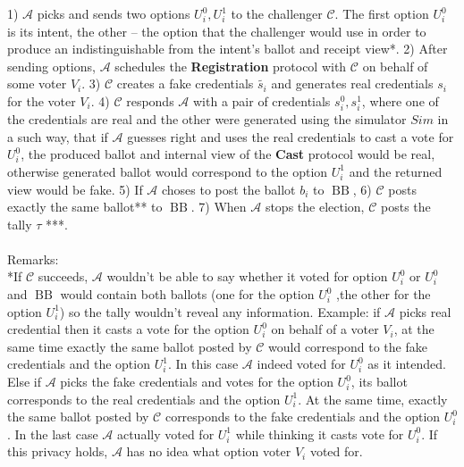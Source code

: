 \documentclass[12pt]{article}
\DeclareMathOperator{\bb}{BB}
\begin{document}
 1)  $\mathcal{A}$ picks and sends two options $U_i^0,U_i^1$ to the challenger $\mathcal{C}$. The first option $U_i^0$ is its intent, the other -- the option that the challenger would use in order to produce an indistinguishable from the intent's ballot and receipt view*. 2) After sending options, $\mathcal{A}$ schedules the   \textbf{Registration} protocol with $\mathcal{C}$ on behalf of some voter $V_i$. 3) $\mathcal{C}$ creates a fake credentials $\tilde{s_i}$ and generates real credentials $s_i$ for the voter $V_i$. 4) $\mathcal{C}$ responds $\mathcal{A}$ with a pair of credentials $s_i^0,s_i^1$, where one of the credentials are real and the other were generated using the simulator $Sim$ in a such way, that if $\mathcal{A}$ guesses right and uses the real credentials to cast a vote for $U_i^0$, the produced ballot and internal view of the \textbf{Cast} protocol would be real, otherwise generated ballot would correspond to the option $U_i^1$ and the returned view would be fake. 5) If $\mathcal{A}$ choses to post the ballot $b_i$ to $\bb$, 6) $\mathcal{C}$  posts exactly the same ballot** to $\bb$. 7) When $\mathcal{A}$ stops the election, $\mathcal{C}$ posts the tally $\tau$ ***. \\\\
Remarks:\\
*If  $\mathcal{C}$ succeeds, $\mathcal{A}$ wouldn't be able to say whether it voted for option $U_i^0$ or $U_i^0$ and $\bb$ would contain both ballots (one for the option $U_i^0$ ,the other for the option $U_i^1$) so the tally wouldn't reveal any information. Example: if $\mathcal{A}$  picks real credential then it casts a vote for the option  $U_i^0$ on behalf of a voter $V_i$, at the same time exactly the same ballot posted by $\mathcal{C}$ would correspond to the fake credentials and the option $U_i^1$. In this case $\mathcal{A}$ indeed voted for $U_i^0$ as it intended. Else if $\mathcal{A}$ picks the fake credentials and votes for the option $U_i^0$,  its ballot corresponds to the real credentials and  the option $U_i^1$. At the same time, exactly the same ballot posted by $\mathcal{C}$ corresponds to the fake credentials  and the option $U_i^0$. In the last case $\mathcal{A}$ actually voted for $U_i^1$ while thinking it casts vote for $U_i^0$. If this privacy holds,  $\mathcal{A}$ has no idea what option voter $V_i$ voted for. \\\\
\end{document}
